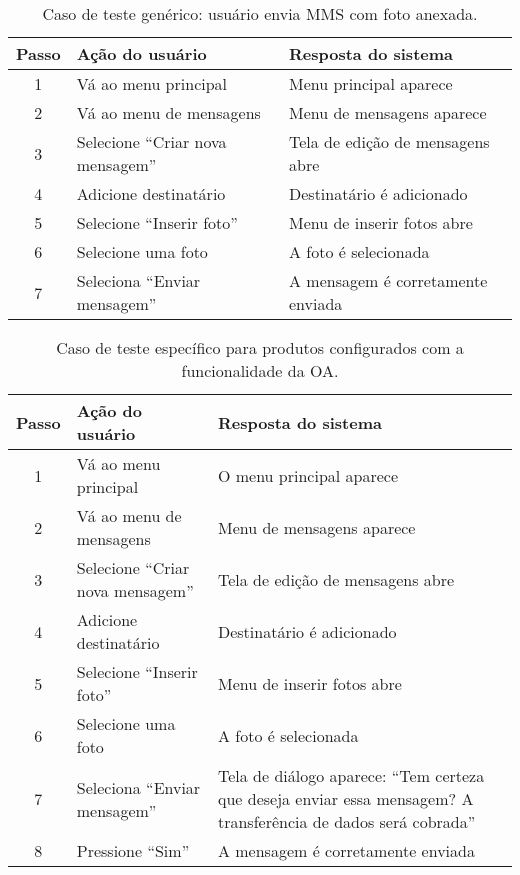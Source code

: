 \begin{table*}[!t] \tiny
  \centering
  \caption{Caso de teste genérico: usuário envia MMS com foto anexada.}
    \begin{tabular}{|c|p{7cm}|p{7cm}|}
    \hline
    \textbf{Passo} & \textbf{Ação do usuário} & \textbf{Resposta do sistema}
    \\
    \hline
    1    & Vá ao menu principal  & Menu principal aparece  \\
    \hline
    2    & Vá ao menu de mensagens  & Menu de mensagens aparece  \\
    \hline
    3    & Selecione ``Criar nova mensagem''  & Tela de edição de mensagens abre
    \\
    \hline
    4    & Adicione destinatário  & Destinatário é adicionado
    \\
    \hline
    5    & Selecione ``Inserir foto''  & Menu de inserir fotos abre
    \\
    \hline
    6    & Selecione uma foto  & A foto é selecionada \\
    \hline
    7    & Seleciona ``Enviar mensagem''  & A mensagem é corretamente enviada
    \\
    \hline
    \end{tabular}
  \label{tab:example1}
\end{table*}

\begin{table*} [!t] \tiny
  \centering
  \caption{Caso de teste específico para produtos configurados com a
  funcionalidade da OA.}
    \begin{tabular}{|c|p{7cm}|p{7cm}|}
    \hline
    \textbf{Passo} & \textbf{Ação do usuário} & \textbf{Resposta do sistema}
    \\
    \hline
    1    & Vá ao menu principal  & O menu principal aparece  \\
    \hline
    2    & Vá ao menu de mensagens  & Menu de mensagens aparece  \\
    \hline
    3    & Selecione ``Criar nova mensagem''  & Tela de edição de mensagens abre  \\
    \hline
    4    & Adicione destinatário  & Destinatário é adicionado \\
    \hline
    5    & Selecione ``Inserir foto''  & Menu de inserir fotos abre \\
    \hline
    6    & Selecione uma foto  & A foto é selecionada \\
    \hline
    7    & Seleciona ``Enviar mensagem''  & Tela de diálogo aparece: 
    ``Tem certeza que deseja enviar essa mensagem? A transferência de dados
    será cobrada'' \\
    \hline
    8    & Pressione ``Sim''  &  A mensagem é corretamente enviada
    \\
    \hline
    \end{tabular}
  \label{tab:specexample1}
\end{table*}


